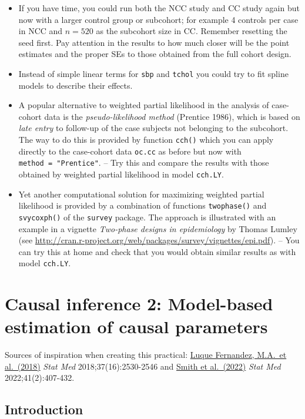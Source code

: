 \documentclass[
]{book}
\begin{document}
\begin{itemize}
\item
  If you have time, you could run both the NCC study and CC study
  again but now with a larger control group or subcohort;
  for example 4 controls per case in NCC and \(n=520\) as the subcohort size in CC.
  Remember resetting the seed first.
  Pay attention in the results to how much closer
  will be the point estimates and the proper SEs to those
  obtained from the full cohort design.
\item
  Instead of simple linear terms for \texttt{sbp} and \texttt{tchol} you could try to fit
  spline models to describe their effects.
\item
  A popular alternative to weighted partial likelihood
  in the analysis of case-cohort data is the \emph{pseudo-likelihood method}
  (Prentice 1986), which is based on \emph{late entry} to follow-up
  of the case subjects not belonging to
  the subcohort.
  The way to do this is provided by function \texttt{cch()} which
  you can apply directly to the case-cohort data \texttt{oc.cc} as before
  but now with \texttt{method\ =\ "Prentice"}. -- Try this and compare the results
  with those obtained by weighted partial likelihood in model
  \texttt{cch.LY}.
\item
  Yet another computational solution for
  maximizing weighted partial likelihood is provided by
  a combination of functions \texttt{twophase()}
  and \texttt{svycoxph()} of the \texttt{survey} package.
  The approach is illustrated with an example
  in a vignette \emph{Two-phase designs in epidemiology} by Thomas Lumley
  (see \url{http://cran.r-project.org/web/packages/survey/vignettes/epi.pdf}).
  -- You can try this at home and check that you would obtain similar results as
  with model \texttt{cch.LY}.
\end{itemize}

\chapter{Causal inference 2: Model-based estimation of causal parameters}\label{causal-inference-2-model-based-estimation-of-causal-parameters}

Sources of inspiration when creating this practical:
\href{https://doi.org/10.1002/sim.7628}{Luque Fernandez, M.A.~et al.~(2018)}
\emph{Stat Med}
2018;37(16):2530-2546 and
\href{https://doi.org/10.1002/sim.9234}{Smith et al.~(2022)} \emph{Stat Med}
2022;41(2):407-432.

\section{Introduction}\label{introduction-3}
\end{document}
